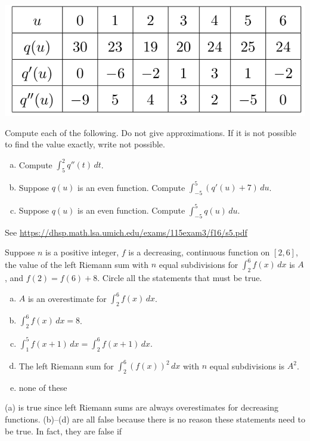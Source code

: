 \documentclass[11pt]{exam}
\begin{document}
\begin{questions}
\begin{center}
  \includegraphics[scale=0.5]{tableq}
\end{center}
Compute each of the following. Do not give approximations. If it is not possible to find the value exactly, write not possible.
\begin{enumerate}[(a)]
	\item Compute $\displaystyle\int_5^2 q''(t) \, dt$.
	\item Suppose $q(u)$ is an even function. Compute $\displaystyle\int_{-5}^5 (q'(u)+7) \, du$.
	\item Suppose $q(u)$ is an even function. Compute $\displaystyle\int_{-5}^5 q(u) \, du$.
\end{enumerate}
\begin{solution}
  See \href{https://dhsp.math.lsa.umich.edu/exams/115exam3/f16/s5.pdf}{https://dhsp.math.lsa.umich.edu/exams/115exam3/f16/s5.pdf}
\end{solution}
\pagebreak
\question Suppose $n$ is a positive integer, $f$ is a decreasing, continuous function on $[2,6]$, the value of the left Riemann sum with $n$ equal subdivisions for $\displaystyle\int_2^6 f(x) \, dx$ is $A$, and $f(2)=f(6)+8$. Circle all the statements that must be true.
\begin{enumerate}[(a)]
	\item $A$ is an overestimate for $\displaystyle\int_2^6 f(x) \, dx$.
	\item $\displaystyle\int_2^6 f(x) \, dx=8$.
	\item $\displaystyle\int_1^5 f(x+1) \, dx = \displaystyle\int_2^6 f(x+1) \, dx$.
	\item The left Riemann sum for $\displaystyle\int_2^6 (f(x))^2 \, dx$ with $n$ equal subdivisions is $A^2$.
	\item none of these
\end{enumerate}
\begin{solution}
  (a) is true since left Riemann sums are always overestimates for
  decreasing functions. (b)--(d) are all false because there is no
  reason these statements need to be true. In fact, they are false if

\end{solution}
\end{questions}
\end{document}
